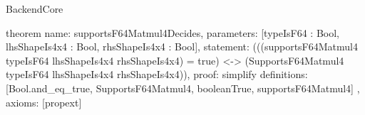 \begin{lexlean}{BackendCore}
\begin{semanticmodule}
theorem{
  name: supportsF64Matmul4Decides,
  parameters: [typeIsF64 : Bool, lhsShapeIs4x4 : Bool, rhsShapeIs4x4 : Bool],
  statement: (((supportsF64Matmul4 typeIsF64 lhsShapeIs4x4 rhsShapeIs4x4) = true) <-> (SupportsF64Matmul4 typeIsF64 lhsShapeIs4x4 rhsShapeIs4x4)),
  proof: simplify{
    definitions: [Bool.and_eq_true, SupportsF64Matmul4, booleanTrue, supportsF64Matmul4]
  },
  axioms: [propext]
}
\end{semanticmodule}
\end{lexlean}

